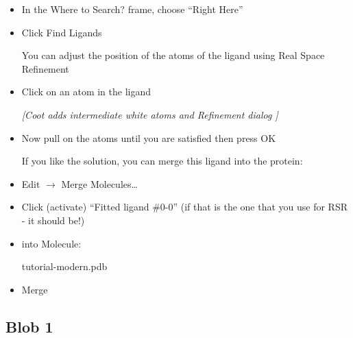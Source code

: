 \documentclass{article}
\begin{document}
\begin{itemize}
\item In the \textsf{Where to Search?} frame, choose ``Right Here''

\item Click \textsf{Find Ligands}

You can adjust the position of the atoms of the ligand using Real Space Refinement

\item Click on an atom in the ligand

  \textsl{ [\emph{Coot} adds intermediate white atoms and Refinement dialog ]}

\item Now pull on the atoms until you are satisfied then press \textsf{OK}

If you like the solution, you can merge this ligand into the protein:
\item \textsf{Edit $\rightarrow$ Merge Molecules\ldots}
\item Click (activate) ``Fitted ligand \#0-0'' (if that is the one that you use for RSR - it should be!)
\item into Molecule:

  \textsf{tutorial-modern.pdb}

\item \textsf{Merge}

\end{itemize}

\subsection{Blob 1}
\end{document}
